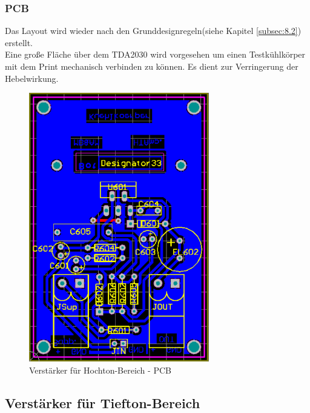 \newpage
\subsubsection{PCB}\label{subsec:5.1.3}
Das Layout wird wieder nach den Grunddesignregeln(siehe Kapitel \ref{subsec:8.2}) erstellt.\\
Eine große Fläche über dem TDA2030 wird vorgesehen um einen Testkühlkörper mit dem Print mechanisch verbinden zu können.
Es dient zur Verringerung der Hebelwirkung.

\begin{figure} [H]
	\centering	
	\includegraphics[width=0.7\textwidth]{img/Print6/HTVerstaerker-PCB.PNG}
	\caption{Verstärker für Hochton-Bereich - PCB}
	\label {fig:5.1.3.1}
\end{figure}


\newpage
\subsection{Verstärker für Tiefton-Bereich}

